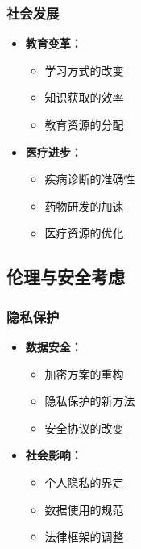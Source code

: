 \documentclass[a4paper,12pt]{ctexart}
\begin{document}
\subsubsection{社会发展}
\begin{itemize}
    \item \textbf{教育变革：}
        \begin{itemize}
            \item 学习方式的改变
            \item 知识获取的效率
            \item 教育资源的分配
        \end{itemize}
    \item \textbf{医疗进步：}
        \begin{itemize}
            \item 疾病诊断的准确性
            \item 药物研发的加速
            \item 医疗资源的优化
        \end{itemize}
\end{itemize}

\subsection{伦理与安全考虑}
\subsubsection{隐私保护}
\begin{itemize}
    \item \textbf{数据安全：}
        \begin{itemize}
            \item 加密方案的重构
            \item 隐私保护的新方法
            \item 安全协议的改变
        \end{itemize}
    \item \textbf{社会影响：}
        \begin{itemize}
            \item 个人隐私的界定
            \item 数据使用的规范
            \item 法律框架的调整
        \end{itemize}
\end{itemize}
\end{document}

